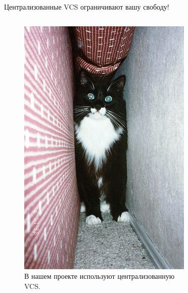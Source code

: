 \documentclass[presentation]{beamer}
\begin{document}

\begin{frame}{Централизованные VCS ограничивают вашу свободу!}
  \begin{columns}
    \begin{column}{0.5\textwidth}
      \begin{figure}[htb]
        \centering
        \includegraphics[width=.8\textwidth]{cat-hiding}
        \caption{В нашем проекте используют централизованную VCS.}
      \end{figure}
    \end{column}
    \begin{column}{0.5\textwidth}
      \begin{figure}[htb]
        \centering

\end{figure}
\end{column}
\end{columns}
\end{frame}
\end{document}

